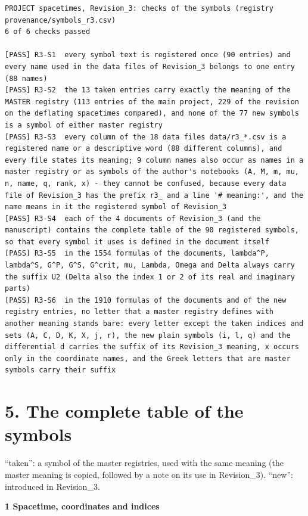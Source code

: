 \documentclass[
  10pt,
]{article}
\begin{document}
\begin{verbatim}
PROJECT spacetimes, Revision_3: checks of the symbols (registry provenance/symbols_r3.csv)
6 of 6 checks passed

[PASS] R3-S1  every symbol text is registered once (90 entries) and every name used in the data files of Revision_3 belongs to one entry (88 names)
[PASS] R3-S2  the 13 taken entries carry exactly the meaning of the MASTER registry (113 entries of the main project, 229 of the revision on the deflating spacetimes compared), and none of the 77 new symbols is a symbol of either master registry
[PASS] R3-S3  every column of the 18 data files data/r3_*.csv is a registered name or a descriptive word (88 different columns), and every file states its meaning; 9 column names also occur as names in a master registry or as symbols of the author's notebooks (A, M, m, mu, n, name, q, rank, x) - they cannot be confused, because every data file of Revision_3 has the prefix r3_ and a line '# meaning:', and the name means in it the registered symbol of Revision_3
[PASS] R3-S4  each of the 4 documents of Revision_3 (and the manuscript) contains the complete table of the 90 registered symbols, so that every symbol it uses is defined in the document itself
[PASS] R3-S5  in the 1554 formulas of the documents, lambda^P, lambda^S, G^P, G^S, G^crit, mu, Lambda, Omega and Delta always carry the suffix U2 (Delta also the index 1 or 2 of its real and imaginary parts)
[PASS] R3-S6  in the 1910 formulas of the documents and of the new registry entries, no letter that a master registry defines with another meaning stands bare: every letter except the taken indices and sets (A, C, D, K, X, j, r), the new plain symbols (i, l, q) and the differential d carries the suffix of its Revision_3 meaning, x occurs only in the coordinate names, and the Greek letters that are master symbols carry their suffix
\end{verbatim}

\hypertarget{the-complete-table-of-the-symbols}{%
\section{5. The complete table of the
symbols}\label{the-complete-table-of-the-symbols}}

``taken'': a symbol of the master registries, used with the same meaning
(the master meaning is copied, followed by a note on its use in
Revision\_3). ``new'': introduced in Revision\_3.

\textbf{1 Spacetime, coordinates and indices}
\end{document}

